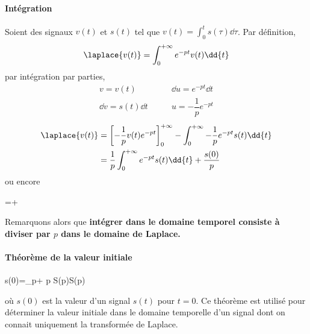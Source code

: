\paragraph{Intégration}
Soient  des signaux $v(t)$ et $s(t)$ tel que 
$v(t)=\int_{0}^{t}s(\tau)\dd{\tau}$. Par définition,
\[
\laplace{v(t)}=\int_{0}^{+\infty} e^{-pt}v(t)\dd{t}
\]
par intégration par parties,
\begin{align*}
    v=v(t)\qquad&\dd{u}=e^{-pt}\dd{t}\\
    \dd{v}=s(t)\dd{t}\qquad&u=-\dfrac{1}{p}e^{-pt}
\end{align*} 
\begin{align*}
    \laplace{v(t)}&=\left[-\dfrac{1}{p}v(t)e^{-pt}\right]_0^{+\infty}
                          -\int_{0}^{+\infty}
                          -\dfrac{1}{p}e^{-pt}s(t)\dd{t} \\
    &=\dfrac{1}{p}\int_{0}^{+\infty} e^{-pt}s(t)\dd{t}+\dfrac{s(0)}{p}
\end{align*}
ou encore
\begin{bequation}
    =+
\end{bequation}
Remarquons alors que \textbf{intégrer dans le domaine temporel consiste à 
diviser par $p$ dans le domaine de Laplace.}
\paragraph{Théorème de la valeur initiale}
\begin{bequation}
    s(0)=\lim\limits_{p\rightarrow+\infty} p S(p)\qquad \forall S(p)
\end{bequation}
où $s(0)$ est la valeur d'un signal $s(t)$ pour $t=0$.
Ce théorème est utilisé pour déterminer la valeur initiale
dans le domaine temporelle d'un signal dont on connait 
uniquement la transformée de Laplace.
